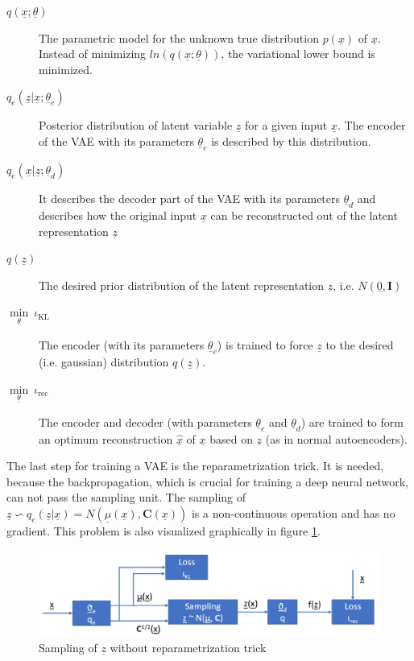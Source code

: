 \documentclass[12pt,DIV14,BCOR12mm,a4paper,footexclude,headinclude,halfparskip-,twoside,openright,cleardoubleempty,idxtotoc,bibtotoc,listtotoc,abstracton]{scrreprt} %
\numberwithin{equation}{chapter}
\begin{document}
\begin{description}
	\item[$q(\underline{x};\underline{\theta})$]The parametric model for the unknown true distribution $p(\underline{x})$ of $\underline{x}$. Instead of minimizing $ln(q(\underline{x};\underline{\theta}))$, the variational lower bound is minimized.
	\item[$q_e(\underline{z}|\underline{x};\underline{\theta}_e)$]Posterior distribution of latent variable $\underline{z}$ for a given input $\underline{x}$. The encoder of the VAE with its parameters $\underline{\theta}_e$ is described by this distribution.
	\item[$q_e(\underline{x}|\underline{z};\underline{\theta}_d)$]It describes the decoder part of the VAE with its parameters $\underline{\theta}_d$ and describes how the original input $\underline{x}$ can be reconstructed out of the latent representation $\underline{z}$
	\item[$q(\underline{z})$]The desired prior distribution of the latent representation $\underline{z}$, i.e. $N(\underline{0}, \mathbf{I})$
	\item[$\underset{\underline{\theta}}\min\ \iota_{\textrm{KL}}$]The encoder (with its parameters $\underline{\theta}_e$) is trained to force $\underline{z}$ to the desired (i.e. gaussian) distribution $q(\underline{z})$.
	\item[$\underset{\underline{\theta}}\min\ \iota_{\textrm{rec}}$]The encoder and decoder (with parameters $\underline{\theta}_e$ and $\underline{\theta}_d$) are trained to form an optimum reconstruction $\hat{\underline{x}}$ of $\underline{x}$ based on $\underline{z}$ (as in normal autoencoders).
\end{description}
The last step for training a VAE is the reparametrization trick. It is needed, because the backpropagation, which is crucial for training a deep neural network, can not pass the sampling unit. The sampling of $\underline{z} \backsim q_e(\underline{z}|\underline{x}) = N(\underline{\mu}(\underline{x}), \mathbf{C}(\underline{x}))$ is a non-continuous operation and has no gradient. This problem is also visualized graphically in figure \ref{fig:Sampling_wo_reparametrization}.
\begin{figure}[htb!]
	\centering
	\includegraphics[width=0.75\linewidth]{Graphiken/VAE_wo_reparametrization}
	\caption{Sampling of $\underline{z}$ without reparametrization trick}
	\label{fig:Sampling_wo_reparametrization}
\end{figure}
\end{document}
